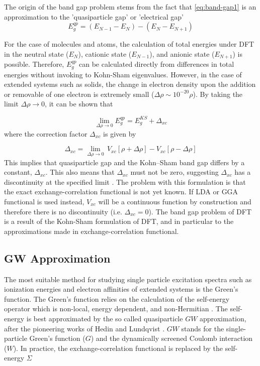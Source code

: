 The origin of the band gap problem stems from the fact that \eqref{eq:band-gap1} is an approximation to the 'quasiparticle gap' or 'electrical gap' \citep{Perdew2017}
\begin{equation}
	E_g^{qp} = (E_{N - 1} - E_{N} )  - (E_{N} - E_{N + 1})
\end{equation}

For the case of molecules and atoms, the calculation of total energies under DFT in the neutral state ($E_{N}$), cationic state ($E_{N-1}$), and anionic state ($E_{N+1}$) is possible. Therefore, $E_g^{qp}$ can be calculated directly from  differences in total energies without invoking to Kohn-Sham eigenvalues. However, in the case of extended systems such as solids, the change in electron density upon the addition or removable of one electron is extremely small ($\Delta\rho \sim 10^{-20} \rho$). By taking the limit $\Delta\rho \rightarrow 0$, it can be shown that \citep{Perdew1982,Perdew1983}

\begin{equation}
	\lim_{\Delta\rho \to 0} E_g^{qp} = E_g^{KS} + \Delta_{xc}
\end{equation}
where the correction factor $\Delta_{xc}$ is given by

\begin{equation} \label{eq:xc_discon}
	\Delta_{xc}  = \lim_{\Delta\rho \to 0}\, V_{xc}[\rho + \Delta\rho] - V_{xc}[\rho - \Delta\rho]
\end{equation}
This implies that quasiparticle gap and the Kohn–Sham band gap
differs by a constant, $\Delta_{xc}$. This also means that $\Delta_{xc}$ must not be zero, suggesting $\Delta_{xc}$ has a discontinuity at the specified limit \citep{Sham1983,Baerends2017}. The problem with this formulation is that the exact exchange-correlation functional is not yet known. If LDA or GGA functional is used instead, $V_{xc}$ will be a continuous function by construction and therefore there is no discontinuity (i.e. $\Delta_{xc} = 0$). The band gap problem of DFT is a result of the Kohn-Sham formulation of DFT, and in particular to the approximations made in exchange-correlation functional.

\subsection{GW Approximation}
The most suitable method for studying  single particle excitation spectra such as ionization energies and electron affinities of extended systems is the Green's function. The Green's function relies on the calculation of the self-energy operator which is non-local, energy dependent, and non-Hermitian \citep{Setten2012}.  The self-energy is best approximated by the so called quasiparticle $GW$ approximation, after the pioneering works of Hedin and Lundqvist \citep{Hedin1965,Hedin1970}. $GW$ stands for the single-particle Green's function ($G$) and the dynamically screened Coulomb interaction ($W$). In practice, the exchange-correlation functional is replaced by the self-energy $\Sigma$ \citep{Hybertsen1986}

